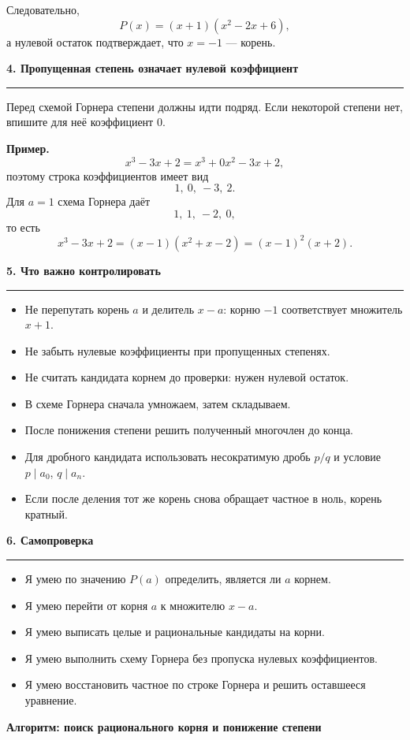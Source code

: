 \documentclass[a4paper,12pt]{article}
\newcommand{\sectiontitle}[1]{%
  \vspace{0.55em}%
  {\Large\bfseries\color{darkaccent}#1}\par
  \vspace{0.25em}\color{linegray}\hrule\color{textgray}\vspace{0.45em}
}
\newcommand{\subhead}[1]{{\bfseries\color{accent}#1}}
\newcommand{\checkline}[1]{\item[$\square$] #1}
\begin{document}
Следовательно,
\[
P(x)=(x+1)(x^2-2x+6),
\]
а нулевой остаток подтверждает, что $x=-1$ --- корень.

\sectiontitle{4. Пропущенная степень означает нулевой коэффициент}

Перед схемой Горнера степени должны идти подряд. Если некоторой степени нет, впишите для неё коэффициент $0$.

\subhead{Пример.}
\[
x^3-3x+2=x^3+0x^2-3x+2,
\]
поэтому строка коэффициентов имеет вид
\[
1,\ 0,\ -3,\ 2.
\]
Для $a=1$ схема Горнера даёт
\[
1,\ 1,\ -2,\ 0,
\]
то есть
\[
x^3-3x+2=(x-1)(x^2+x-2)=(x-1)^2(x+2).
\]

\sectiontitle{5. Что важно контролировать}

\begin{itemize}
  \checkline{Не перепутать корень $a$ и делитель $x-a$: корню $-1$ соответствует множитель $x+1$.}
  \checkline{Не забыть нулевые коэффициенты при пропущенных степенях.}
  \checkline{Не считать кандидата корнем до проверки: нужен нулевой остаток.}
  \checkline{В схеме Горнера сначала умножаем, затем складываем.}
  \checkline{После понижения степени решить полученный многочлен до конца.}
  \checkline{Для дробного кандидата использовать несократимую дробь $p/q$ и условие $p\mid a_0$, $q\mid a_n$.}
  \checkline{Если после деления тот же корень снова обращает частное в ноль, корень кратный.}
\end{itemize}

\sectiontitle{6. Самопроверка}
\begin{itemize}
  \checkline{Я умею по значению $P(a)$ определить, является ли $a$ корнем.}
  \checkline{Я умею перейти от корня $a$ к множителю $x-a$.}
  \checkline{Я умею выписать целые и рациональные кандидаты на корни.}
  \checkline{Я умею выполнить схему Горнера без пропуска нулевых коэффициентов.}
  \checkline{Я умею восстановить частное по строке Горнера и решить оставшееся уравнение.}
\end{itemize}

\clearpage
\thispagestyle{plain}
\begin{center}
{\LARGE\bfseries\color{darkaccent}Алгоритм: поиск рационального корня и понижение степени}
\end{center}
\vspace{0.8cm}
\end{document}
